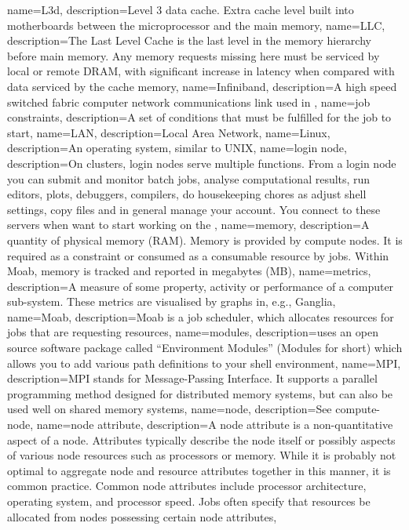 {
  name={L3d},
  description={Level 3 data cache. Extra cache level built into motherboards between the microprocessor and the main memory},
}
{
  name={LLC},
  description={The Last Level Cache is the last level in the memory hierarchy before main memory. Any memory requests missing here must be serviced by local or remote DRAM, with significant increase in latency when compared with data serviced by the cache memory},
}
{
  name={Infiniband},
  description={A high speed switched fabric computer network communications link used in \hpc},
}
{
  name={job constraints},
  description={A set of conditions that must be fulfilled for the job to start},
}
{
  name={LAN},
  description={Local Area Network},
}
{
  name={Linux},
  description={An operating system, similar to UNIX},
}
{
  name={login node},
  description={On \hpc clusters, login nodes serve multiple functions. From a login node you can submit and monitor batch jobs, analyse computational results, run editors, plots, debuggers, compilers, do housekeeping chores as adjust shell settings, copy files and in general manage your account. You connect to these servers when want to start working on the \hpcInfra},
}
{
  name={memory},
  description={A quantity of physical memory (RAM). Memory is provided by compute nodes. It is required as a constraint or consumed as a consumable resource by jobs. Within Moab, memory is tracked and reported in megabytes (MB)},
}
{
  name={metrics},
  description={A measure of some property, activity or performance of a computer sub-system. These metrics are visualised by graphs in, e.g., Ganglia},
}
{
  name={Moab},
  description={Moab is a job scheduler, which allocates resources for jobs that are requesting resources},
}
{
  name={modules},
  description={\hpc uses an open source software package called ``Environment Modules'' (Modules for short) which allows you to add various path definitions to your shell environment},
}
{
  name={MPI},
  description={MPI stands for Message-Passing Interface. It supports a parallel programming method designed for distributed memory systems, but can also be used well on shared memory systems},
}
{
  name={node},
  description={See \gls{compute-node}},
}
{
  name={node attribute},
  description={A node attribute is a non-quantitative aspect of a node. Attributes typically describe the node itself or possibly aspects of various node resources such as processors or memory. While it is probably not optimal to aggregate node and resource attributes together in this manner, it is common practice. Common node attributes include processor architecture, operating system, and processor speed. Jobs often specify that resources be allocated from nodes possessing certain node attributes},
}
